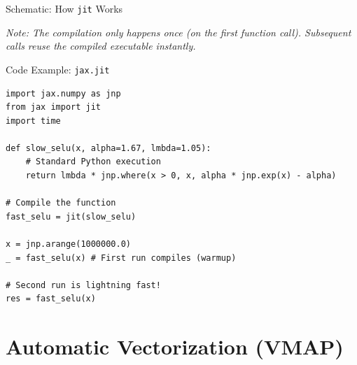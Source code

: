 \documentclass[aspectratio=169]{beamer}
\begin{document}
\begin{frame}{Schematic: How \texttt{jit} Works}
    \begin{center}
    \end{center}

    \vspace{0.3cm}
    \small \textit{Note: The compilation only happens once (on the first function call). Subsequent calls reuse the compiled executable instantly.}
\end{frame}

\begin{frame}[fragile]{Code Example: \texttt{jax.jit}}
    \begin{lstlisting}
import jax.numpy as jnp
from jax import jit
import time

def slow_selu(x, alpha=1.67, lmbda=1.05):
    # Standard Python execution
    return lmbda * jnp.where(x > 0, x, alpha * jnp.exp(x) - alpha)

# Compile the function
fast_selu = jit(slow_selu)

x = jnp.arange(1000000.0)
_ = fast_selu(x) # First run compiles (warmup)

# Second run is lightning fast!
res = fast_selu(x)
    \end{lstlisting}
\end{frame}

\section{Automatic Vectorization (VMAP)}
\end{document}
